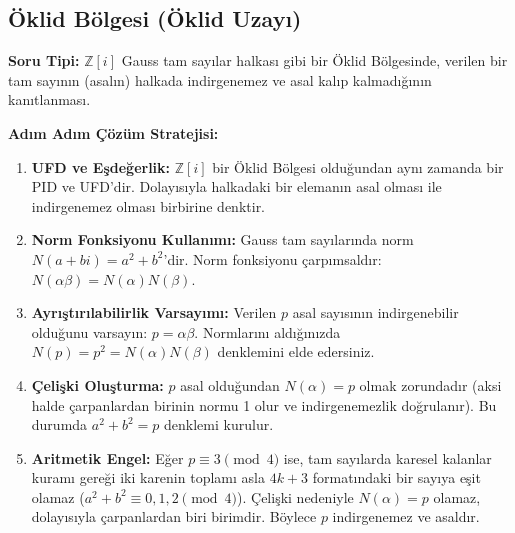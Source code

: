 \documentclass[11pt, a4paper]{article}
\begin{document}
\subsection{Öklid Bölgesi (Öklid Uzayı)}
\begin{konubox}[title={\faGraduationCap\enspace Soru Tipi ve Adım Adım Çözüm Stratejisi}]
\textbf{Soru Tipi:} $\mathbb{Z}[i]$ Gauss tam sayılar halkası gibi bir Öklid Bölgesinde, verilen bir tam sayının (asalın) halkada indirgenemez ve asal kalıp kalmadığının kanıtlanması.

\textbf{Adım Adım Çözüm Stratejisi:}
\begin{enumerate}
    \item \textbf{UFD ve Eşdeğerlik:} $\mathbb{Z}[i]$ bir Öklid Bölgesi olduğundan aynı zamanda bir PID ve UFD'dir. Dolayısıyla halkadaki bir elemanın asal olması ile indirgenemez olması birbirine denktir.
    \item \textbf{Norm Fonksiyonu Kullanımı:} Gauss tam sayılarında norm $N(a+bi) = a^2+b^2$'dir. Norm fonksiyonu çarpımsaldır: $N(\alpha\beta) = N(\alpha)N(\beta)$.
    \item \textbf{Ayrıştırılabilirlik Varsayımı:} Verilen $p$ asal sayısının indirgenebilir olduğunu varsayın: $p = \alpha\beta$. Normlarını aldığınızda $N(p) = p^2 = N(\alpha)N(\beta)$ denklemini elde edersiniz.
    \item \textbf{Çelişki Oluşturma:} $p$ asal olduğundan $N(\alpha) = p$ olmak zorundadır (aksi halde çarpanlardan birinin normu 1 olur ve indirgenemezlik doğrulanır). Bu durumda $a^2+b^2 = p$ denklemi kurulur.
    \item \textbf{Aritmetik Engel:} Eğer $p \equiv 3 \pmod 4$ ise, tam sayılarda karesel kalanlar kuramı gereği iki karenin toplamı asla $4k+3$ formatındaki bir sayıya eşit olamaz ($a^2+b^2 \equiv 0, 1, 2 \pmod 4$). Çelişki nedeniyle $N(\alpha) = p$ olamaz, dolayısıyla çarpanlardan biri birimdir. Böylece $p$ indirgenemez ve asaldır.
\end{enumerate}
\end{konubox}

\newpage
\end{document}
